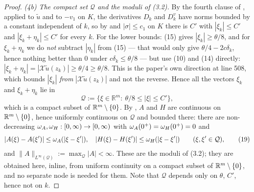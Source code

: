 \begin{proof}
\emph{(4b) The compact set $\mathcal Q$ and the moduli of (3.2).} By the fourth clause
of , applied to $\tilde u$ and to $-v_1$ on $K$, the
derivatives $D_k$ and $D^{v}_k$ have norms bounded by a constant independent of $k$, so by
 and $|\sigma|\le c_1$ on $K$ there is $C'$ with
$|\xi_k|\le C'$ and $|\xi_k+\eta_k|\le C'$ for every $k$. For the lower bounds: (15) gives
$|\xi_k|\ge\theta/8$, and for $\xi_k+\eta_k$ we do \emph{not} subtract $|\eta_k|$ from (15)
--- that would only give $\theta/4-2c\delta_k$, hence nothing better than $0$ under
$c\delta_k\le\theta/8$ --- but use (10) and (14) directly:
$|\xi_k+\eta_k|=|\mathcal X\tilde u(z_k)|\ge\theta/4\ge\theta/8$. This is the paper's own
direction at line 508, which bounds $|\xi_k|$ \emph{from} $|\mathcal X\tilde u(z_k)|$ and
not the reverse. Hence all the vectors $\xi_k$ and
$\xi_k+\eta_k$ lie in
\[
 \mathcal Q:=\{\xi\in\mathbb R^{m}:\ \theta/8\le|\xi|\le C'\} ,
\]
which is a compact subset of $\mathbb R^{m}\setminus\{0\}$. By ,
$A$ and $H$ are continuous on $\mathbb R^{m}\setminus\{0\}$, hence uniformly continuous on
$\mathcal Q$ and bounded there: there are non-decreasing $\omega_A,\omega_H:[0,\infty)\to[0,\infty)$
with $\omega_A(0^{+})=\omega_H(0^{+})=0$ and
\[
 |A(\xi)-A(\xi')|\le\omega_A(|\xi-\xi'|),\quad |H(\xi)-H(\xi')|\le\omega_H(|\xi-\xi'|)
 \qquad(\xi,\xi'\in\mathcal Q), \tag{19}
\]
and $\|A\|_{L^\infty(\mathcal Q)}:=\max_{\mathcal Q}|A|<\infty$. These are the moduli of
(3.2); they are obtained here, inline, from uniform continuity on a compact subset of
$\mathbb R^{m}\setminus\{0\}$, and no separate node is needed for them. Note that $\mathcal Q$
depends only on $\theta$, $C'$, hence not on $k$.


\end{proof}

